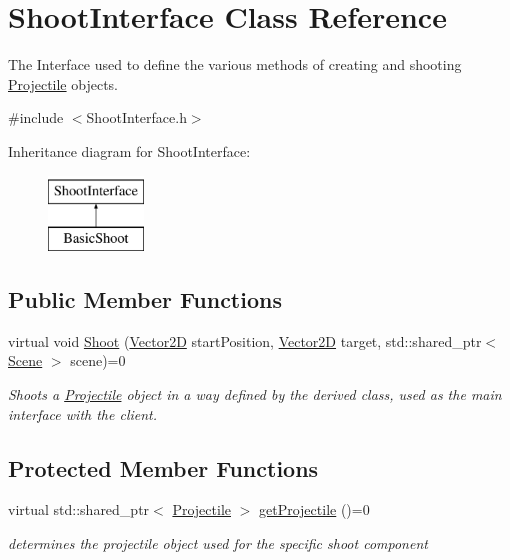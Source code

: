 \hypertarget{class_shoot_interface}{}\section{Shoot\+Interface Class Reference}
\label{class_shoot_interface}


The Interface used to define the various methods of creating and shooting \hyperlink{class_projectile}{Projectile} objects.  




{\ttfamily \#include $<$Shoot\+Interface.\+h$>$}

Inheritance diagram for Shoot\+Interface\+:\begin{figure}[H]
\begin{center}
\leavevmode
\includegraphics[height=2.000000cm]{d9/d8a/class_shoot_interface}
\end{center}
\end{figure}
\subsection*{Public Member Functions}
\begin{DoxyCompactItemize}
\item 
virtual void \hyperlink{class_shoot_interface_a67205cc4e2fed90fa8c1ec93b30b864d}{Shoot} (\hyperlink{class_vector2_d}{Vector2D} start\+Position, \hyperlink{class_vector2_d}{Vector2D} target, std\+::shared\+\_\+ptr$<$ \hyperlink{class_scene}{Scene} $>$ scene)=0
\begin{DoxyCompactList}\small\item\em Shoots a \hyperlink{class_projectile}{Projectile} object in a way defined by the derived class, used as the main interface with the client. \end{DoxyCompactList}\end{DoxyCompactItemize}
\subsection*{Protected Member Functions}
\begin{DoxyCompactItemize}
\item 
virtual std\+::shared\+\_\+ptr$<$ \hyperlink{class_projectile}{Projectile} $>$ \hyperlink{class_shoot_interface_ad274b0c66a0a42bf194b32b704c8bfea}{get\+Projectile} ()=0
\begin{DoxyCompactList}\small\item\em determines the projectile object used for the specific shoot component \end{DoxyCompactList}\end{DoxyCompactItemize}



